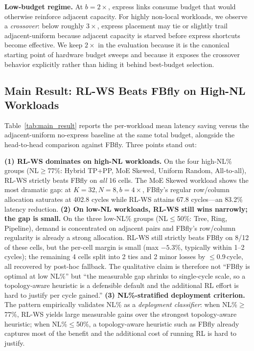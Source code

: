 \documentclass[conference]{IEEEtran}
\begin{document}
\textbf{Low-budget regime.} At $b=2\times$, express links consume budget that would otherwise reinforce adjacent capacity. For highly non-local workloads, we observe a \textit{crossover}: below roughly $3\times$, express placement may tie or slightly trail adjacent-uniform because adjacent capacity is starved before express shortcuts become effective. We keep $2\times$ in the evaluation because it is the canonical starting point of hardware budget sweeps and because it exposes the crossover behavior explicitly rather than hiding it behind best-budget selection.

\subsection{Main Result: RL-WS Beats FBfly on High-NL Workloads}
\label{subsec:main}

Table~\ref{tab:main_result} reports the per-workload mean latency saving versus the adjacent-uniform no-express baseline at the same total budget, alongside the head-to-head comparison against FBfly. Three points stand out:

\textbf{(1) RL-WS dominates on high-NL workloads.} On the four high-NL\% groups (NL$\ge$77\%: Hybrid TP+PP, MoE Skewed, Uniform Random, All-to-all), RL-WS strictly beats FBfly on \textit{all} 16 cells. The MoE Skewed workload shows the most dramatic gap: at $K{=}32, N{=}8, b{=}4\times$, FBfly's regular row/column allocation saturates at 402.8 cycles while RL-WS attains 67.8 cycles---an 83.2\% latency reduction.
\textbf{(2) On low-NL workloads, RL-WS still wins narrowly; the gap is small.} On the three low-NL\% groups (NL$\le$50\%: Tree, Ring, Pipeline), demand is concentrated on adjacent pairs and FBfly's row/column regularity is already a strong allocation. RL-WS still strictly beats FBfly on 8/12 of these cells, but the per-cell margin is small (max $-5.3\%$, typically within 1--2\,cycles); the remaining 4 cells split into 2 ties and 2 minor losses by $\le$0.9\,cycle, all recovered by post-hoc fallback. The qualitative claim is therefore not ``FBfly is optimal at low NL\%'' but ``the measurable gap shrinks to single-cycle scale, so a topology-aware heuristic is a defensible default and the additional RL effort is hard to justify per cycle gained.''
\textbf{(3) NL\%-stratified deployment criterion.} The pattern empirically validates NL\% as a \textit{deployment classifier}: when NL\%$\ge$77\%, RL-WS yields large measurable gains over the strongest topology-aware heuristic; when NL\%$\le$50\%, a topology-aware heuristic such as FBfly already captures most of the benefit and the additional cost of running RL is hard to justify.
\end{document}
